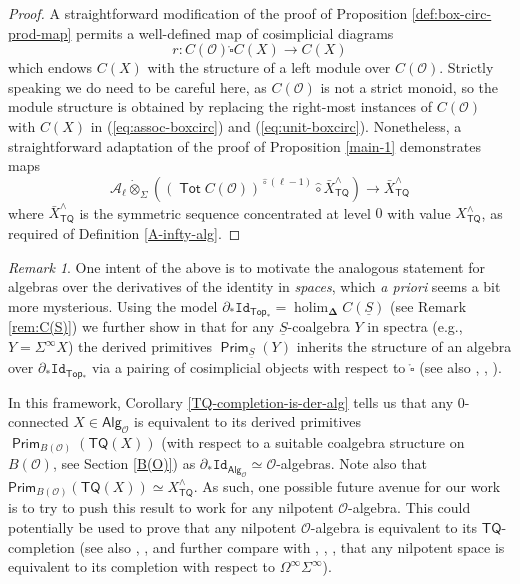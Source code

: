 \documentclass[11pt]{amsart}
\theoremstyle{definition}
\theoremstyle{remark}
\newtheorem{remark}[subsection]{Remark}
\newcommand{\TQ}{\mathsf{TQ}}
\newcommand{\Sp}{\Sigma^{\infty}}
\newcommand{\U}{\Omega^{\infty}}
\newcommand{\Tot}{\operatorname{\mathsf{Tot}}}
\newcommand{\holim}{\operatorname{holim}}
\newcommand{\Alg}[1]{ {\mathsf{Alg}_{\mathcal{#1}}} }
\newcommand{\Id}{\mathtt{Id}}
\newcommand{\Cal}[1]{\mathcal{#1}}
\newcommand{\circhat}{\hat{\circ}}
\newcommand{\tensordot}{\dot{\otimes}}
\newcommand{\boxcirc}{\mathring{\square}}
\newcommand{\bdel}{\mathbf{\Delta}}
\newcommand{\Prim}{\operatorname{\mathsf{Prim}}}
\begin{document}
\begin{proof}
    A straightforward modification of the proof of Proposition \ref{def:box-circ-prod-map} permits a well-defined map of cosimplicial diagrams \[r\colon  C(\Cal{O}) \boxcirc C(X)\to C(X)\] which endows $C(X)$ with the structure of a left module over $ C(\Cal{O})$. Strictly speaking we do need to be careful here, as $ C(\Cal{O})$ is not a strict monoid, so the module structure is obtained by replacing the right-most instances of $ C(\Cal{O})$ with $C(X)$ in (\ref{eq:assoc-boxcirc}) and (\ref{eq:unit-boxcirc}). Nonetheless, a straightforward adaptation of the proof of Proposition \ref{main-1} demonstrates maps \[\Cal{A}_{\ell} \tensordot_{\Sigma}  \left( (\Tot C(\Cal{O}))^{\circhat (\ell-1)} \circhat \bar{X}_{\TQ}^{\wedge}\right)\to \bar{X}_{\TQ}^{\wedge}\] where $\bar{X}_{\TQ}^{\wedge}$ is the symmetric sequence concentrated at level $0$ with value $X_{\TQ}^{\wedge}$, as required of Definition \ref{A-infty-alg}.
\end{proof}

\begin{remark}
    One intent of the above is to motivate the analogous statement for algebras over the derivatives of the identity in \textit{spaces}, which \textit{a priori} seems a bit more mysterious. Using the model $\partial_* \Id_{\mathsf{Top}_*} =\holim_{\bdel} C(\underline{S})$ (see Remark \ref{rem:C(S)}) we further show in \cite{Clark-2} that for any $\underline{S}$-coalgebra $Y$ in spectra (e.g., $Y=\Sp X$) the derived primitives $\Prim_{\underline{S}}(Y)$ inherits the structure of an algebra over $\partial_* \Id_{\mathsf{Top}_*}$ via a pairing of cosimplicial objects with respect to $\boxcirc$ (see also \cite{Ching-thesis}, \cite{Heuts-vn}, \cite{BR}).
    
    In this framework, Corollary \ref{TQ-completion-is-der-alg} tells us that any $0$-connected $X\in \Alg{O}$ is equivalent to its derived primitives $\Prim_{B(\Cal{O})}( \TQ(X) )$ (with respect to a suitable coalgebra structure on $B(\Cal{O})$, see Section \ref{B(O)}) as $\partial_* \Id_{\Alg{O}}\simeq \Cal{O}$-algebras. Note also that $\mathsf{Prim}_{B(\Cal{O})}(\TQ(X))\simeq X^{\wedge}_{\TQ}$. As such, one possible future avenue for our work is to try to push this result to work for any nilpotent $\Cal{O}$-algebra. This could potentially be used to prove that any nilpotent $\Cal{O}$-algebra is equivalent to its $\TQ$-completion (see also \cite{Blom}, \cite{Niko}, and further compare with \cite{BK}, \cite{AK}, \cite{Carl}, \cite{BH-2} that any nilpotent space is equivalent to its completion with respect to $\U \Sp$).
    
    
\end{remark}






\end{document}
